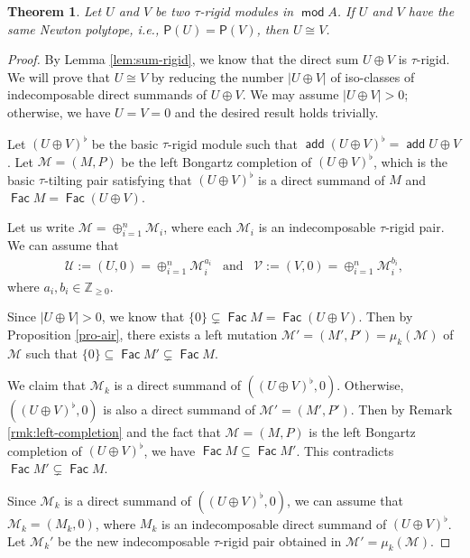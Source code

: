 \documentclass[10pt]{amsart}
\newtheorem{theorem}{Theorem}[section]
\theoremstyle{definition}
\theoremstyle{remark}
\numberwithin{equation}{section}
\def\mod{\opname{mod}\nolimits}
\newcommand{\opname}[1]{\operatorname{\mathsf{#1}}}
\newcommand{\Fac}{\opname{Fac}}
\newcommand{\add}{\opname{add}\nolimits}
\begin{document}
\begin{theorem}
 Let $U$ and $V$ be two $\tau$-rigid modules in $\mod A$. If $U$ and $V$ have the same Newton polytope, i.e., $\mathsf P(U)=\mathsf P(V)$, then $U\cong V$.    
\end{theorem}
\begin{proof}
By Lemma \ref{lem:sum-rigid}, we know that the direct sum $U\oplus V$ is $\tau$-rigid.  We will prove that $U\cong V$ by reducing the number $|U\oplus V|$ of iso-classes of indecomposable direct summands of $U\oplus V$.
We may assume $|U\oplus V|>0$; otherwise, we have $U=V=0$ and the desired result holds trivially. 



Let $(U\oplus V)^\flat$ be the basic $\tau$-rigid module such that $\add (U\oplus V)^\flat=\add U\oplus V$. Let $\mathcal M=(M,P)$ be the left Bongartz completion of $(U\oplus V)^\flat$, which is the basic $\tau$-tilting pair satisfying that $(U\oplus V)^\flat$ is a direct summand of $M$ and $\Fac M=\Fac (U\oplus V)$. 

Let us write $\mathcal M=\oplus_{i=1}^n\mathcal M_i$, where each $\mathcal M_i$ is an indecomposable $\tau$-rigid pair. We can assume that 
\begin{eqnarray}\label{eqn:MN-ab}
  \mathcal U:=(U,0)=\oplus_{i=1}^n \mathcal M_i^{a_i}\;\;\; \text{and}\;\;\;\mathcal V:=(V,0)=\oplus_{i=1}^n \mathcal M_i^{b_i},  
\end{eqnarray}
where $a_i, b_i\in\mathbb Z_{\geq 0}$. 


Since $|U\oplus V|>0$, we know that $\{0\}\subsetneq \Fac M=\Fac (U\oplus V)$. Then by Proposition \ref{pro-air}, there exists a left mutation $\mathcal M'=(M',P')=\mu_k(\mathcal M)$ of $\mathcal M$ such that $\{0\}\subseteq \Fac M'\subsetneq \Fac M$. 

We claim that $\mathcal M_k$ is a direct summand of $((U\oplus V)^\flat,0)$. Otherwise,  $((U\oplus V)^\flat,0)$ is also a direct summand of $\mathcal M'=(M', P')$. Then by Remark \ref{rmk:left-completion} and the fact that  $\mathcal M=(M,P)$ is the left Bongartz completion of $(U\oplus V)^\flat$, we have $\Fac M\subseteq \Fac M'$. This contradicts  $\Fac M'\subsetneq \Fac M$.

Since $\mathcal M_k$ is a direct summand of $((U\oplus V)^\flat,0)$, we can assume that $\mathcal M_k=(M_k,0)$, where $M_k$ is an indecomposable direct summand of $(U\oplus V)^\flat$. Let $\mathcal M_k'$ be the new indecomposable $\tau$-rigid pair obtained in $\mathcal M'=\mu_k(\mathcal M)$. 



\end{proof}
\end{document}
